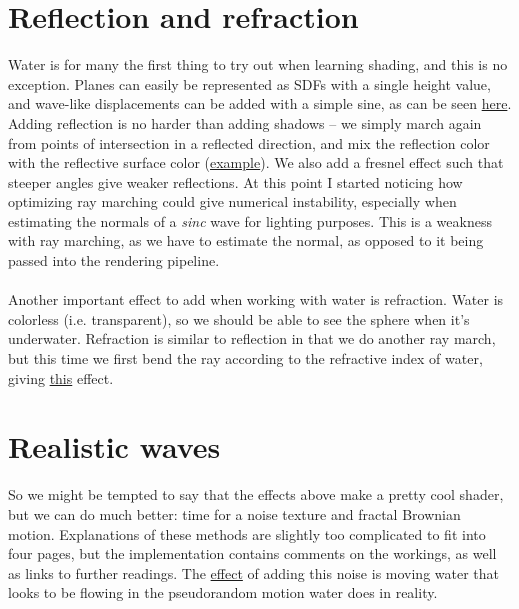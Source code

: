 \documentclass[abstract=off,oneside]{scrreprt}
\begin{document}
\section*{Reflection and refraction}
\label{sec-8}
\label{sec:water}
Water is for many the first thing to try out when learning shading,
and this is no exception. Planes can easily be represented as SDFs
with a single height value, and wave-like displacements can be added
with a simple sine, as can be seen \hyperref[fig:simplewater]{here}. Adding reflection is no
harder than adding shadows -- we simply march again from points of
intersection in a reflected direction, and mix the reflection color
with the reflective surface color (\hyperref[fig:reflection]{example}). We also add a fresnel
effect such that steeper angles give weaker reflections. At this point
I started noticing how optimizing ray marching could give numerical
instability, especially when estimating the normals of a \emph{sinc} wave
for lighting purposes. This is a weakness with ray marching, as we
have to estimate the normal, as opposed to it being passed into the
rendering pipeline.
\\\\
Another important effect to add when working with water is
refraction. Water is colorless (i.e. transparent), so we should be
able to see the sphere when it's underwater. Refraction is similar to
reflection in that we do another ray march, but this time we first
bend the ray according to the refractive index of water, giving
\hyperref[fig:refraction]{this} effect.

\section*{Realistic waves}
\label{sec-9}
\label{sec:realisticwaves}
So we might be tempted to say that the effects above make a pretty
cool shader, but we can do much better: time for a noise texture and
fractal Brownian motion. Explanations of these methods are slightly
too complicated to fit into four pages, but the implementation
contains comments on the workings, as well as links to further
readings. The \hyperref[fig:noise]{effect} of adding this noise is moving water that
looks to be flowing in the pseudorandom motion water does in reality.
\end{document}
